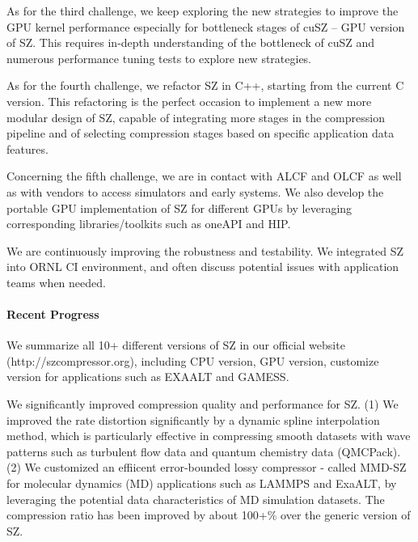 As for the third challenge, we keep exploring the new strategies to improve the GPU kernel performance especially for bottleneck stages of cuSZ -- GPU version of SZ. This requires in-depth understanding of the bottleneck of cuSZ and numerous performance tuning tests to explore new strategies.   

As for the fourth challenge, we refactor SZ in C++, starting from the current C version. This refactoring is the perfect occasion to implement a new more modular design of SZ, capable of integrating more stages in the compression pipeline and of selecting compression stages based on specific application data features.

Concerning the fifth challenge, we are in contact with ALCF and OLCF as well as with vendors to access simulators and early systems. We also develop the portable GPU implementation of SZ for different GPUs by leveraging corresponding libraries/toolkits such as oneAPI and HIP.

We are continuously improving the robustness and testability. We integrated SZ into ORNL CI environment, and often discuss potential issues with application teams when needed. 

\paragraph{Recent Progress}

We summarize all 10+ different versions of SZ in our official website (http://szcompressor.org), including CPU version, GPU version, customize version for applications such as EXAALT and GAMESS. 

We significantly improved compression quality and performance for SZ. (1) We improved the rate distortion significantly by a dynamic spline interpolation method, which is particularly effective in compressing smooth datasets with wave patterns such as turbulent flow data and quantum chemistry data (QMCPack). (2) We customized an effiicent error-bounded lossy compressor - called MMD-SZ for molecular dynamics (MD) applications such as LAMMPS and ExaALT, by leveraging the potential data characteristics of MD simulation datasets. The compression ratio has been improved by about 100+\% over the generic version of SZ. 

